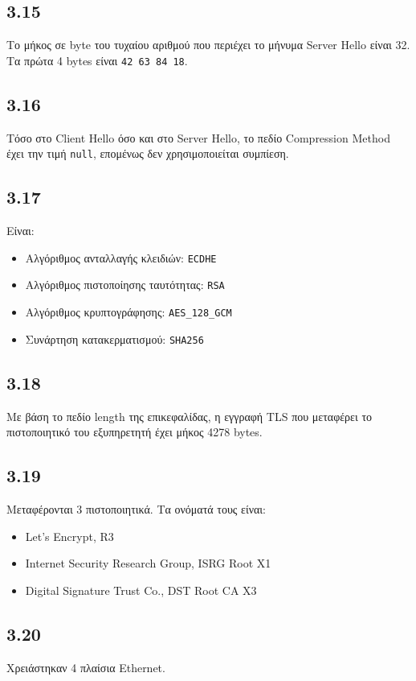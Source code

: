 		\subsection*{3.15}
			Το μήκος σε byte του τυχαίου αριθμού που περιέχει το μήνυμα Server Hello είναι 32. Τα πρώτα 4 bytes είναι \verb|42 63 84 18|.

		\subsection*{3.16}
			Τόσο στο Client Hello όσο και στο Server Hello, το πεδίο Compression Method έχει την τιμή \verb|null|, επομένως δεν χρησιμοποιείται συμπίεση.

		\subsection*{3.17}
			Είναι:
			
			\begin{itemize}
				\item Αλγόριθμος ανταλλαγής κλειδιών: \verb|ECDHE|
				\item Αλγόριθμος πιστοποίησης ταυτότητας: \verb|RSA|
				\item Αλγόριθμος κρυπτογράφησης: \verb|AES_128_GCM|
				\item Συνάρτηση κατακερματισμού: \verb|SHA256|
			\end{itemize}

		\subsection*{3.18}
			Με βάση το πεδίο length της επικεφαλίδας, η εγγραφή TLS που μεταφέρει το πιστοποιητικό του εξυπηρετητή έχει μήκος 4278 bytes.

		\subsection*{3.19}
			Μεταφέρονται 3 πιστοποιητικά. Τα ονόματά τους είναι: 
			
			\begin{itemize}
				\item Let's Encrypt, R3
				\item Internet Security Research Group, ISRG Root X1
				\item Digital Signature Trust Co., DST Root CA X3
			\end{itemize}

		\subsection*{3.20}
			Χρειάστηκαν 4 πλαίσια Ethernet.

